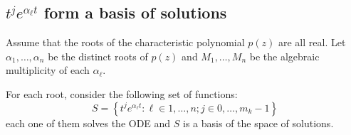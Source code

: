 \documentclass[12pt]{extarticle}
\numberwithin{equation}{section}
\begin{document}
\subsection{\texorpdfstring{$t^j e^{\alpha_\ell t}$ form a basis of solutions}{Basis of solutions}}

\begin{theorem}{}{}
	Assume that the roots of the characteristic polynomial $p(z)$ are all real.
	Let $\alpha_1, \dots, \alpha_n$ be the distinct roots of $p(z)$ and
	$M_1, \dots, M_n$ be the algebraic multiplicity of each $\alpha_\ell$.

	For each root, consider the following set of functions:
	\begin{equation}
		S = \left\{ t^j e^{\alpha_\ell t} : \ell \in 1, \dots, n; j \in 0, \dots, m_k -1 \right\}
	\end{equation}
	each one of them solves the ODE and $S$ is a basis of the space of solutions.
\end{theorem}
\end{document}
